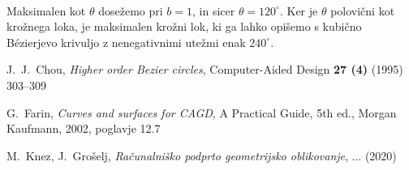 \documentclass[a4paper,11pt]{article}
\theoremstyle{definition}
\theoremstyle{plain}
\begin{document}
\\
Maksimalen kot $\theta$ dosežemo pri $b=1$, in sicer $\theta=120^{\circ}$. Ker je $\theta$ polovični kot krožnega loka, je maksimalen krožni lok, ki ga lahko opišemo s kubično B\'ezierjevo krivuljo z nenegativnimi utežmi enak $240^{\circ}$.
\newpage
\begin{thebibliography}{99}
J.~J.~Chou, \emph{Higher order Bezier circles}, Computer-Aided Design \textbf{27 (4)} (1995) 303--309

G.~Farin, \emph{Curves and surfaces for CAGD}, A Practical Guide, 5th ed., Morgan Kaufmann, 2002, poglavje 12.7

M.~Knez, J.~Grošelj, \emph{Računalniško podprto geometrijsko oblikovanje}, ... (2020)
\end{thebibliography}
\end{document}
